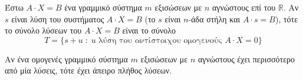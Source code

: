 \begin{thm}
  Έστω $ A\cdot X=B $ ένα γραμμικό σύστημα $m$ εξισώσεων με $n$ αγνώστους επί του 
  $ \mathbb{R} $. Αν $s$ είναι λύση του συστήματος $ A\cdot X=B $ (το $s$ είναι $n$-άδα 
  στήλη και $ A\cdot s =B $), τότε το σύνολο λύσεων του $ A\cdot X=B $ είναι το σύνολο
  \[
    T = \{ s+u \; : \; u \; \text{λύση του αντίστοιχου ομογενούς } A\cdot X=0 \} 
  \] 
\end{thm}

\begin{cor}
  Αν ένα ομογενές γραμμικό σύστημα $m$ εξισώσεων με $n$ αγνώστους έχει περισσότερο από 
  μία λύσεις, τότε έχει άπειρο πλήθος λύσεων.
\end{cor}



